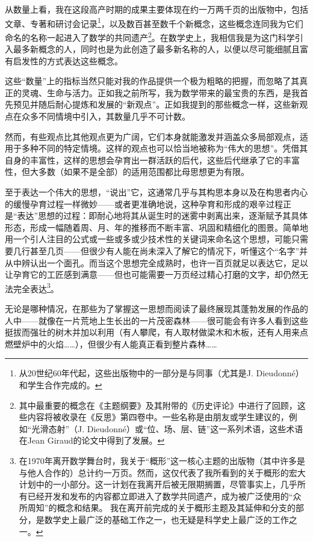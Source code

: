 从数量上看，我在这段高产时期的成果主要体现在约一万两千页的出版物中，包括文章、专著和研讨会记录\footnote{从20世纪60年代起，这些出版物中的一部分是与同事（尤其是J. Dieudonné）和学生合作完成的。}，以及数百甚至数千个新概念，这些概念连同我为它们命名的名称一起进入了数学的共同遗产\footnote{其中最重要的概念在《主题纲要》及其附带的《历史评论》中进行了回顾，这些内容将被收录在《反思》第四卷中。一些名称是由朋友或学生建议的，例如“光滑态射”（J. Dieudonné）或“位、场、层、链”这一系列术语，这些术语在Jean Giraud的论文中得到了发展。}。在数学史上，我相信我是为这门科学引入最多新概念的人，同时也是为此创造了最多新名称的人，以便以尽可能细腻且富有启发性的方式表达这些概念。

这些“数量”上的指标当然只能对我的作品提供一个极为粗略的把握，而忽略了其真正的灵魂、生命与活力。正如我之前所写，我为数学带来的最宝贵的东西，是我首先预见并随后耐心提炼和发展的“新观点”。正如我提到的那些概念一样，这些新观点在众多不同情境中引入，其数量几乎不可计数。

然而，有些观点比其他观点更为广阔，它们本身就能激发并涵盖众多局部观点，适用于多种不同的特定情境。这样的观点也可以恰当地被称为“伟大的思想”。凭借其自身的丰富性，这样的思想会孕育出一群活跃的后代，这些后代继承了它的丰富性，但大多数（如果不是全部）的适用范围都比母思想更为有限。

至于表达一个伟大的思想，“说出”它，这通常几乎与其构思本身以及在构思者内心的缓慢孕育过程一样微妙——或者更准确地说，这种孕育和形成的艰辛过程正是“表达”思想的过程：即耐心地将其从诞生时的迷雾中剥离出来，逐渐赋予其具体形态，形成一幅随着周、月、年的推移而不断丰富、巩固和精细化的图景。简单地用一个引人注目的公式或一些或多或少技术性的关键词来命名这个思想，可能只需要几行甚至几页——但很少有人能在尚未深入了解它的情况下，听懂这个“名字”并从中辨认出一个面孔。而当这个思想完全成熟时，也许一百页就足以表达它，足以让孕育它的工匠感到满意——但也可能需要一万页经过精心打磨的文字，却仍然无法完全表达\footnote{在1970年离开数学舞台时，我关于“概形”这一核心主题的出版物（其中许多是与他人合作的）总计约一万页。然而，这仅代表了我所看到的关于概形的宏大计划中的一小部分。这一计划在我离开后被无限期搁置，尽管事实上，几乎所有已经开发和发布的内容都立即进入了数学共同遗产，成为被广泛使用的“众所周知”的概念和结果。
我在离开前完成的关于概形主题及其延伸和分支的部分，是数学史上最广泛的基础工作之一，也无疑是科学史上最广泛的工作之一。}。

无论是哪种情况，在那些为了掌握这一思想而阅读了最终展现其蓬勃发展的作品的人中——就像在一片荒地上生长出的一片茂密森林——很可能会有许多人看到这些挺拔而强壮的树木并加以利用（有人攀爬，有人取材做梁木和木板，还有人用来点燃壁炉中的火焰……），但很少有人能真正看到整片森林……